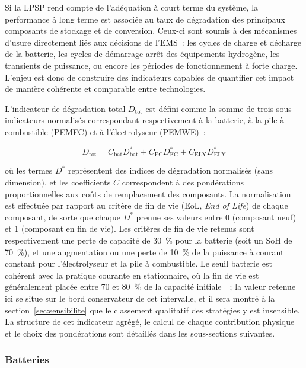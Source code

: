 Si la LPSP rend compte de l'adéquation à court terme du système, la performance à long terme est associée au taux de dégradation des principaux composants de stockage et de conversion. Ceux-ci sont soumis à des mécanismes d'usure directement liés aux décisions de l'EMS~: les cycles de charge et décharge de la batterie, les cycles de démarrage-arrêt des équipements hydrogène, les transients de puissance, ou encore les périodes de fonctionnement à forte charge. L'enjeu est donc de construire des indicateurs capables de quantifier cet impact de manière cohérente et comparable entre technologies.

L'indicateur de dégradation total $D_{\text{tot}}$ est défini comme la somme de trois sous-indicateurs normalisés correspondant respectivement à la batterie, à la pile à combustible (PEMFC) et à l'électrolyseur (PEMWE)~:

\begin{equation}
    D_{\text{tot}} = C_{\text{bat}} D_{\text{bat}}^{*} + C_{\text{FC}} D_{\text{FC}}^{*} + C_{\text{ELY}} D_{\text{ELY}}^{*}
    \label{eq:degradation_total}
\end{equation}

où les termes $D^{*}$ représentent des indices de dégradation normalisés (sans dimension), et les coefficients $C$ correspondent à des pondérations proportionnelles aux coûts de remplacement des composants. La normalisation est effectuée par rapport au critère de fin de vie (EoL, \textit{End of Life}) de chaque composant, de sorte que chaque $D^{*}$ prenne ses valeurs entre 0 (composant neuf) et 1 (composant en fin de vie). Les critères de fin de vie retenus sont respectivement une perte de capacité de \SI{30}{\percent} pour la batterie (soit un SoH de \SI{70}{\percent}), et une augmentation ou une perte de \SI{10}{\percent} de la puissance à courant constant pour l'électrolyseur et la pile à combustible. Le seuil batterie est cohérent avec la pratique courante en stationnaire, où la fin de vie est généralement placée entre 70 et \SI{80}{\percent} de la capacité initiale~\cite{madani_comprehensive_2025}~; la valeur retenue ici se situe sur le bord conservateur de cet intervalle, et il sera montré à la section~\ref{sec:sensibilite} que le classement qualitatif des stratégies y est insensible. La structure de cet indicateur agrégé, le calcul de chaque contribution physique et le choix des pondérations sont détaillés dans les sous-sections suivantes.

\subsubsection{Batteries}

